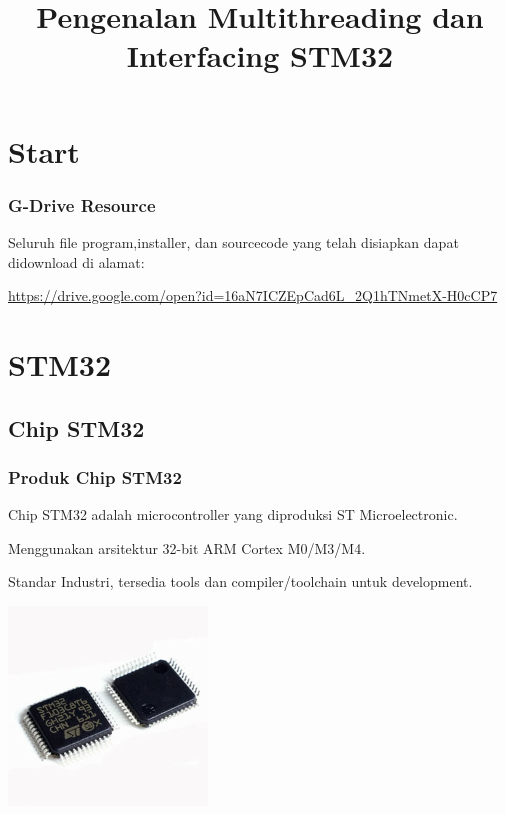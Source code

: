 \documentclass[table,dvipsnames]{beamer}
\title[STM32 Beginner Guide]{Pengenalan Multithreading dan Interfacing STM32}
\author{}
\institute[CodeDirect-FTITOS]{
	Achmadi ST MT\\
	\medskip
	\textit{}
}
\date{}
\begin{document}
	\section{Start}

	\begin{frame}
	\titlepage
	\end{frame}

	\begin{frame}
		\frametitle{G-Drive Resource}
		\begin{exampleblock}{}
			\begin{exampleblock}{}
			Seluruh file program,installer, dan sourcecode
			yang telah disiapkan dapat didownload di alamat:\\
			\end{exampleblock}
			
			\begin{exampleblock}{}
			\url{https://drive.google.com/open?id=16aN7ICZEpCad6L_2Q1hTNmetX-H0cCP7}
			\end{exampleblock}
		\end{exampleblock}
	\end{frame}

	\section{STM32}
	\subsection{Chip STM32}
	\begin{frame}
		\frametitle{Produk Chip STM32}
		\begin{exampleblock}{}
			Chip STM32 adalah microcontroller yang diproduksi ST Microelectronic.
		\end{exampleblock}

		\begin{exampleblock}{}
			Menggunakan arsitektur 32-bit ARM Cortex M0/M3/M4.
		\end{exampleblock}

		\begin{exampleblock}{}
			Standar Industri, tersedia tools dan compiler/toolchain untuk development.
		\end{exampleblock}
		\begin{center}
			\includegraphics[width=150pt]{images/stm32f103c8}
		\end{center}
	\end{frame}
\end{document}
